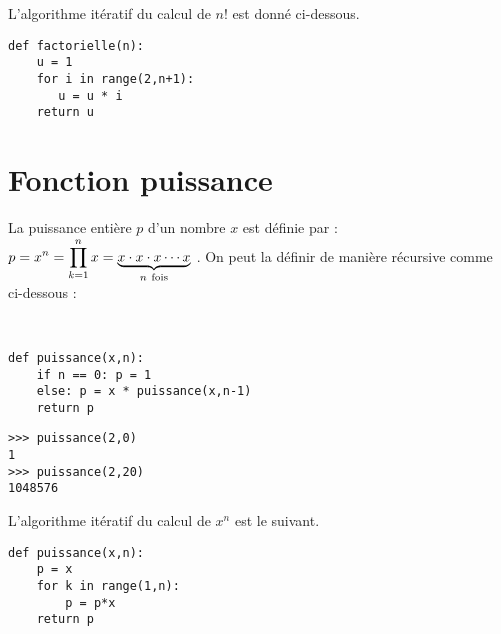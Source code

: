 \noindent L'algorithme itératif du calcul de $n!$ est donné ci-dessous.

\begin{lstlisting}[caption={\bf Fonction factorielle},label=cl:factorielle]
def factorielle(n):
    u = 1
    for i in range(2,n+1):
       u = u * i
    return u
\end{lstlisting}

\section*{Fonction puissance}
La puissance entière $p$ d'un nombre $x$ est définie par :
$\displaystyle p = x^n = \prod_{k=1}^{n} x = \underbrace{x\cdot x\cdot x\cdots x}_{n\ \rm fois}$ .
On peut la définir de manière récursive comme ci-dessous :

\mbox{}\ \ \begin{py}{8cm}
\begin{verbatim}
def puissance(x,n):
    if n == 0: p = 1
    else: p = x * puissance(x,n-1)
    return p
\end{verbatim}
\end{py}
\hfill
\begin{py}{5cm}
\begin{verbatim}
>>> puissance(2,0)
1
>>> puissance(2,20)
1048576
\end{verbatim}
\end{py}
\vspace*{2mm}

\noindent L'algorithme itératif du calcul de $x^n$ est le suivant.

\begin{lstlisting}[caption={\bf Fonction puissance},label=cl:puissance]
def puissance(x,n):
    p = x
    for k in range(1,n):
        p = p*x
    return p
\end{lstlisting}

